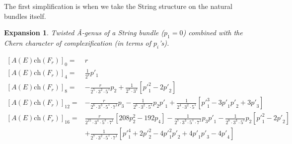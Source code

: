 \documentclass{amsart}
\theoremstyle{plain}
\newcommand{\ch}{\mathrm{ch}}
\numberwithin{equation}{section}
\newtheorem{ex}{Expansion}
\begin{document}


\medskip
The first simplification is when we take the String structure on 
the natural bundles itself. 


\begin{ex}
Twisted \^{A}-genus of a String bundle ($p_1=0$) combined with the Chern character of complexification (in terms of $p_i$'s).
\end{ex} 



\begin{tcolorbox}[text width=16cm, height=4.5cm,
title=Twisted A-genus with a String structure]
{\footnotesize
\begin{align*} 
 {[A(E)\ch(F_r)]}_0 = &r
\\
 {[A(E)\ch(F_r)]}_4 = &\tfrac{1}{2^1}p'_1  
\\
 {[A(E)\ch(F_r)]}_8 = & -\tfrac{r}{2^5\cdot 3^2\cdot 5^1}  p_2
+\tfrac{1}{2^3\cdot 3^1} [ {p'}_1^2-2 {p'}_2]
\\
 {[A(E)\ch(F_r)]}_{12} = &-\tfrac{r}{2^6\cdot 3^3\cdot 5^1\cdot 7^1}p_3
  -\tfrac{1}{2^6\cdot 3^2\cdot 5^1}p_2  {p'}_1
  +\tfrac{1}{2^4\cdot 3^2\cdot 5^1} [ {p'}_1^3- 3  {p'}_1  {p'}_2+3 {p'}_3]
\\
 {[A(E)\ch(F_r)]}_{16} = &\tfrac{r}{2^{15}\cdot 3^4\cdot 5^2\cdot 7^1}
  [ 208 p_2^2 -192 p_4]-
    \tfrac{1}{2^7\cdot 3^3\cdot 5^1\cdot 7^1} p_3 {p'}_1
 -\tfrac{1}{2^8\cdot 3^3\cdot 5^1} p_2 [ {p'}_1^2-2 {p'}_2]
    \\
    & 
   +\tfrac{1}{2^7\cdot 3^2\cdot 5^1\cdot 7^1} [{p'}_1^4+2 
  {p'}_2^2-4  {p'}_1^2  {p'}_2+4  {p'}_1  {p'}_3-4 {p'}_4]
\end{align*}
}
\end{tcolorbox}




%
%
%
%
%
%
%
%
%
\end{document}
